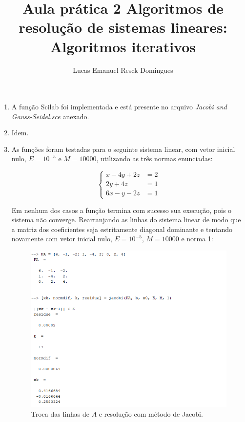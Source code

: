 \documentclass[11pt]{article}
\begin{document}
\author{Lucas Emanuel Resck Domingues}
\title{Aula prática 2
\medbreak
\large Algoritmos de resolução de sistemas lineares: \\
Algoritmos iterativos}
\maketitle

\medskip

\begin{enumerate}

\item A função Scilab foi implementada e está presente no arquivo \textit{Jacobi and Gauss-Seidel.sce} anexado.

\item Idem.

\item As funções foram testadas para o seguinte sistema linear, com vetor inicial nulo, $E = 10^{-5}$ e $M = 10000$, utilizando as três normas enunciadas:

$$\begin{cases}
    x - 4y + 2z &= 2\\
    2y + 4z &= 1\\
    6x - y - 2z &= 1
\end{cases}$$

Em nenhum dos casos a função termina com sucesso sua execução, pois o sistema não converge. Rearranjando as linhas do sistema linear de modo que a matriz dos coeficientes seja estritamente diagonal dominante e tentando novamente com vetor inicial nulo, $E = 10^{-5}$, $M = 10000$ e norma 1:

\begin{figure}[H]
    \centering
    \includegraphics[]{3-Jacobi}
    \caption{Troca das linhas de $A$ e resolução com método de Jacobi.}
\end{figure}


\end{enumerate}
\end{document}
